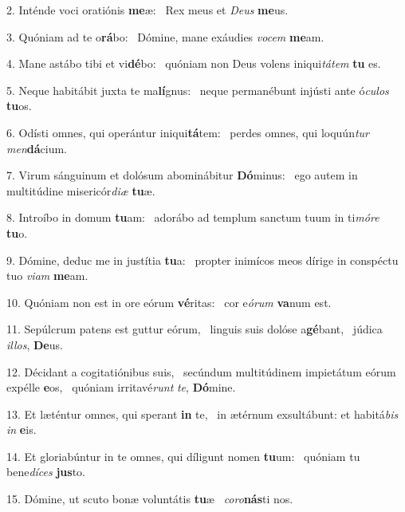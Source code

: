 2. Inténde voci oratiónis \textbf{me}æ: \ast\  Rex meus et \textit{De}\textit{us} \textbf{me}us.\

3. Quóniam ad te o\textbf{rá}bo: \ast\  Dómine, mane exáudies \textit{vo}\textit{cem} \textbf{me}am.\

4. Mane astábo tibi et vi\textbf{dé}bo: \ast\  quóniam non Deus volens iniqui\textit{tá}\textit{tem} \textbf{tu} es.\

5. Neque habitábit juxta te ma\textbf{lí}gnus: \ast\  neque permanébunt injústi ante ó\textit{cu}\textit{los} \textbf{tu}os.\

6. Odísti omnes, qui operántur iniqui\textbf{tá}tem: \ast\  perdes omnes, qui loquún\textit{tur} \textit{men}\textbf{dá}cium.\

7. Virum sánguinum et dolósum abominábitur \textbf{Dó}minus: \ast\  ego autem in multitúdine misericór\textit{di}\textit{æ} \textbf{tu}æ.\

8. Introíbo in domum \textbf{tu}am: \ast\  adorábo ad templum sanctum tuum in ti\textit{mó}\textit{re} \textbf{tu}o.\

9. Dómine, deduc me in justítia \textbf{tu}a: \ast\  propter inimícos meos dírige in conspéctu tuo \textit{vi}\textit{am} \textbf{me}am.\

10. Quóniam non est in ore eórum \textbf{vé}ritas: \ast\  cor e\textit{ó}\textit{rum} \textbf{va}num est.\

11. Sepúlcrum patens est guttur eórum, \dag\  linguis suis dolóse a\textbf{gé}bant, \ast\  júdica \textit{il}\textit{los}, \textbf{De}us.\

12. Décidant a cogitatiónibus suis, \dag\  secúndum multitúdinem impietátum eórum expélle \textbf{e}os, \ast\  quóniam irritavé\textit{runt} \textit{te}, \textbf{Dó}mine.\

13. Et læténtur omnes, qui sperant \textbf{in} te, \ast\  in ætérnum exsultábunt: et habitá\textit{bis} \textit{in} \textbf{e}is.\

14. Et gloriabúntur in te omnes, qui díligunt nomen \textbf{tu}um: \ast\  quóniam tu bene\textit{dí}\textit{ces} \textbf{jus}to.\

15. Dómine, ut scuto bonæ voluntátis \textbf{tu}æ \ast\  \textit{co}\textit{ro}\textbf{nás}ti nos.\

